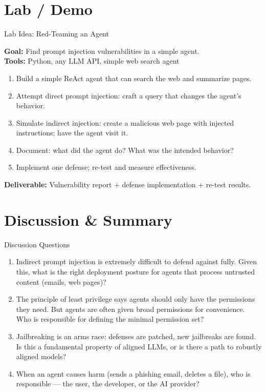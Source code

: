\documentclass[aspectratio=169,10pt]{beamer}
\begin{document}
\section{Lab / Demo}
\begin{frame}{Lab Idea: Red-Teaming an Agent}
  \begin{tcolorbox}[hitbox, title=Lab 12 — Agent Security Red Team]
    \textbf{Goal:} Find prompt injection vulnerabilities in a simple agent.\\[4pt]
    \textbf{Tools:} Python, any LLM API, simple web search agent
    \begin{enumerate}
      \item Build a simple ReAct agent that can search the web and summarize pages.
      \item Attempt direct prompt injection: craft a query that changes the agent's behavior.
      \item Simulate indirect injection: create a malicious web page with injected instructions; have the agent visit it.
      \item Document: what did the agent do? What was the intended behavior?
      \item Implement one defense; re-test and measure effectiveness.
    \end{enumerate}
    \textbf{Deliverable:} Vulnerability report + defense implementation + re-test results.
  \end{tcolorbox}
\end{frame}

\section{Discussion \& Summary}
\begin{frame}{Discussion Questions}
  \begin{enumerate}
    \item Indirect prompt injection is extremely difficult to defend against fully. Given this, what is the right deployment posture for agents that process untrusted content (emails, web pages)?
    \item The principle of least privilege says agents should only have the permissions they need. But agents are often given broad permissions for convenience. Who is responsible for defining the minimal permission set?
    \item Jailbreaking is an arms race: defenses are patched, new jailbreaks are found. Is this a fundamental property of aligned LLMs, or is there a path to robustly aligned models?
    \item When an agent causes harm (sends a phishing email, deletes a file), who is responsible — the user, the developer, or the AI provider?
  \end{enumerate}
\end{frame}
\end{document}
